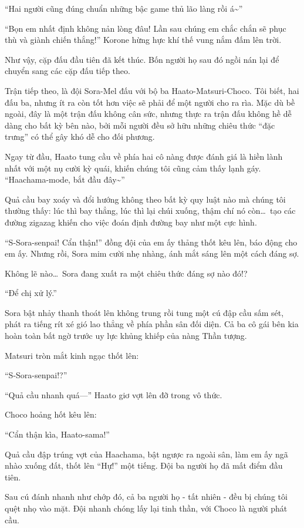 \documentclass[../main.tex]{subfiles}
\begin{document}
``Hai người cũng đúng chuẩn những bậc game thủ lão làng rồi á\~{}''

``Bọn em nhất định không nản lòng đâu! Lần sau chúng em chắc chắn sẽ phục thù và giành chiến thắng!'' Korone hừng hực khí thế vung nắm đấm lên trời.

Như vậy, cặp đấu đầu tiên đã kết thúc. Bốn người họ sau đó ngồi nán lại để chuyển sang các cặp đấu tiếp theo.

\ct

Trận tiếp theo, là đội Sora-Mel đấu với bộ ba Haato-Matsuri-Choco. Tôi biết, hai đấu ba, nhưng ít ra còn tốt hơn việc sẽ phải để một người cho ra rìa. Mặc dù bề ngoài, đây là một trận đấu không cân sức, nhưng thực ra trận đấu không hề dễ dàng cho bất kỳ bên nào, bởi mỗi người đều sở hữu những chiêu thức ``đặc trưng'' có thể gây khó dễ cho đối phương.

Ngay từ đầu, Haato tung cầu về phía hai cô nàng được đánh giá là hiền lành nhất với một nụ cười kỳ quái, khiến chúng tôi cũng cảm thấy lạnh gáy. ``Haachama-mode, bắt đầu đây\~{}''

Quả cầu bay xoáy và đổi hướng không theo bất kỳ quy luật nào mà chúng tôi thường thấy: lúc thì bay thẳng, lúc thì lại chúi xuống, thậm chí nó còn\dots\ tạo các đường zigazag khiến cho việc đoán định đường bay như một cực hình.

``S-Sora-senpai! Cẩn thận!'' đồng đội của em ấy thảng thốt kêu lên, báo động cho em ấy. Nhưng rồi, Sora mim cười nhẹ nhàng, ánh mắt sáng lên một cách đáng sợ.

Không lẽ nào\dots\ Sora đang xuất ra một chiêu thức đáng sợ nào đó!?

``Để chị xử lý.''

Sora bật nhảy thanh thoát lên không trung rồi tung một cú đập cầu sấm sét, phát ra tiếng rít xé gió lao thẳng về phía phần sân đối diện. Cả ba cô gái bên kia hoàn toàn bất ngờ trước uy lực khủng khiếp của nàng Thần tượng.

Matsuri tròn mắt kinh ngạc thốt lên:

``S-Sora-senpai!?''

``Quả cầu nhanh quá---'' Haato giơ vợt lên đỡ trong vô thức.

Choco hoảng hốt kêu lên:

``Cẩn thận kìa, Haato-sama!''

Quả cầu đập trúng vợt của Haachama, bật ngược ra ngoài sân, làm em ấy ngã nhào xuống đất, thốt lên ``Hự!'' một tiếng. Đội ba người họ đã mất điểm đầu tiên.

Sau cú đánh nhanh như chớp đó, cả ba người họ - tất nhiên - đều bị chúng tôi quệt nhọ vào mặt. Đội nhanh chóng lấy lại tinh thần, với Choco là người phát cầu.
\end{document}
